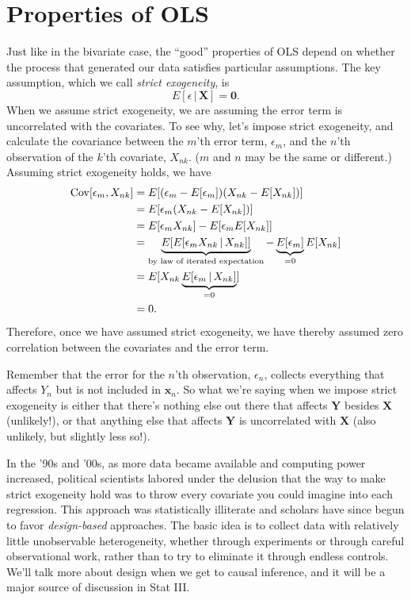 \documentclass[
  12pt,
  oneside,openany]{book}
\begin{document}
\hypertarget{properties-of-ols}{%
\section{Properties of OLS}\label{properties-of-ols}}

Just like in the bivariate case, the ``good'' properties of OLS depend on whether the process that generated our data satisfies particular assumptions. The key assumption, which we call \emph{strict exogeneity}, is
\[
E[\epsilon \,|\, \mathbf{X}] = \mathbf{0}.
\]
When we assume strict exogeneity, we are assuming the error term is uncorrelated with the covariates.
To see why, let's impose strict exogeneity, and calculate the covariance between the \(m\)'th error term, \(\epsilon_m\), and the \(n\)'th observation of the \(k\)'th covariate, \(X_{nk}\).
(\(m\) and \(n\) may be the same or different.)
Assuming strict exogeneity holds, we have
\[
\begin{aligned}
\mathop{\rm Cov}\nolimits[\epsilon_m, X_{nk}]
&= E[(\epsilon_m - E[\epsilon_m])(X_{nk} - E[X_{nk}])] \\
&= E[ \epsilon_m (X_{nk} - E[X_{nk}]) ] \\
&= E[ \epsilon_m X_{nk} ] - E [ \epsilon_m E[X_{nk}] ] \\
&= \underbrace{E[ E[ \epsilon_m X_{nk} \,|\, X_{nk} ] ]}_{\text{by law of iterated expectation}} - \underbrace{E [\epsilon_m]}_{= 0} E[ X_{nk} ] \\
&= E[ X_{nk} \underbrace{E[\epsilon_m \,|\, X_{nk}]}_{=0} ] \\
&= 0.
\end{aligned}
\]
Therefore, once we have assumed strict exogeneity, we have thereby assumed zero correlation between the covariates and the error term.

Remember that the error for the \(n\)'th observation, \(\epsilon_n\), collects everything that affects \(Y_n\) but is not included in \(\mathbf{x}_n\). So what we're saying when we impose strict exogeneity is either that there's nothing else out there that affects \(\mathbf{Y}\) besides \(\mathbf{X}\) (unlikely!), or that anything else that affects \(\mathbf{Y}\) is uncorrelated with \(\mathbf{X}\) (also unlikely, but slightly less so!).

In the '90s and '00s, as more data became available and computing power increased, political scientists labored under the delusion that the way to make strict exogeneity hold was to throw every covariate you could imagine into each regression. This approach was statistically illiterate \citep{clarke2005phantom} and scholars have since begun to favor \emph{design-based} approaches. The basic idea is to collect data with relatively little unobservable heterogeneity, whether through experiments or through careful observational work, rather than to try to eliminate it through endless controls. We'll talk more about design when we get to causal inference, and it will be a major source of discussion in Stat III.
\end{document}
